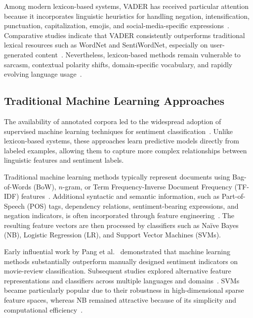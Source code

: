 \documentclass[a4paper,fleqn]{cas-dc}
\begin{document}
Among modern lexicon-based systems, VADER has received particular attention because it incorporates linguistic heuristics for handling negation, intensification, punctuation, capitalization, emojis, and social-media-specific expressions~\cite{hutto2014vader,id:Nursal2025Battle}. Comparative studies indicate that VADER consistently outperforms traditional lexical resources such as WordNet and SentiWordNet, especially on user-generated content~\cite{id:Nursal2025Battle}. Nevertheless, lexicon-based methods remain vulnerable to sarcasm, contextual polarity shifts, domain-specific vocabulary, and rapidly evolving language usage~\cite{behdenna2018document,id:Nursal2025Battle}.

\subsection{Traditional Machine Learning Approaches}

The availability of annotated corpora led to the widespread adoption of supervised machine learning techniques for sentiment classification~\cite{azzeddine2018sentiment}. Unlike lexicon-based systems, these approaches learn predictive models directly from labeled examples, allowing them to capture more complex relationships between linguistic features and sentiment labels.

Traditional machine learning methods typically represent documents using Bag-of-Words (BoW), $n$-gram, or Term Frequency-Inverse Document Frequency (TF-IDF) features~\cite{behdenna2018document}. Additional syntactic and semantic information, such as Part-of-Speech (POS) tags, dependency relations, sentiment-bearing expressions, and negation indicators, is often incorporated through feature engineering~\cite{azzeddine2018sentiment}. The resulting feature vectors are then processed by classifiers such as Naïve Bayes (NB), Logistic Regression (LR), and Support Vector Machines (SVMs).

Early influential work by Pang et al.~\cite{Pang2002thumbs} demonstrated that machine learning methods substantially outperform manually designed sentiment indicators on movie-review classification. Subsequent studies explored alternative feature representations and classifiers across multiple languages and domains~\cite{Pak2011ClassificationEP, Rushdi2011opinion, Zhang2014sentiment}. SVMs became particularly popular due to their robustness in high-dimensional sparse feature spaces, whereas NB remained attractive because of its simplicity and computational efficiency~\cite{behdenna2018document}.
\end{document}
